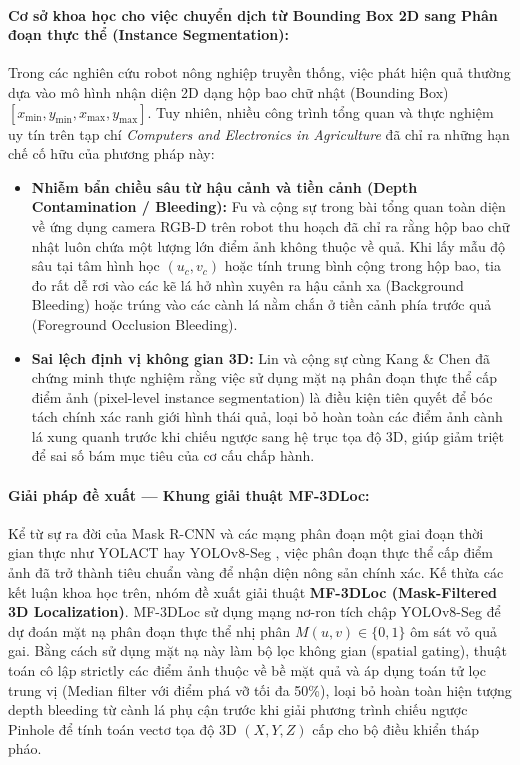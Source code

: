\documentclass[12pt,a4paper]{article}
\begin{document}
\paragraph{Cơ sở khoa học cho việc chuyển dịch từ Bounding Box 2D sang Phân đoạn thực thể (Instance Segmentation):}
Trong các nghiên cứu robot nông nghiệp truyền thống, việc phát hiện quả thường dựa vào mô hình nhận diện 2D dạng hộp bao chữ nhật (Bounding Box) $[x_{\min}, y_{\min}, x_{\max}, y_{\max}]$. Tuy nhiên, nhiều công trình tổng quan và thực nghiệm uy tín trên tạp chí \textit{Computers and Electronics in Agriculture} đã chỉ ra những hạn chế cố hữu của phương pháp này:
\begin{itemize}
    \item \textbf{Nhiễm bẩn chiều sâu từ hậu cảnh và tiền cảnh (Depth Contamination / Bleeding):} Fu và cộng sự \cite{fu2020rgbd} trong bài tổng quan toàn diện về ứng dụng camera RGB-D trên robot thu hoạch đã chỉ ra rằng hộp bao chữ nhật luôn chứa một lượng lớn điểm ảnh không thuộc về quả. Khi lấy mẫu độ sâu tại tâm hình học $(u_c, v_c)$ hoặc tính trung bình cộng trong hộp bao, tia đo rất dễ rơi vào các kẽ lá hở nhìn xuyên ra hậu cảnh xa (Background Bleeding) hoặc trúng vào các cành lá nằm chắn ở tiền cảnh phía trước quả (Foreground Occlusion Bleeding).
    \item \textbf{Sai lệch định vị không gian 3D:} Lin và cộng sự \cite{lin2021fruit} cùng Kang \& Chen \cite{kang2020dasnet} đã chứng minh thực nghiệm rằng việc sử dụng mặt nạ phân đoạn thực thể cấp điểm ảnh (pixel-level instance segmentation) là điều kiện tiên quyết để bóc tách chính xác ranh giới hình thái quả, loại bỏ hoàn toàn các điểm ảnh cành lá xung quanh trước khi chiếu ngược sang hệ trục tọa độ 3D, giúp giảm triệt để sai số bám mục tiêu của cơ cấu chấp hành.
\end{itemize}

\paragraph{Giải pháp đề xuất --- Khung giải thuật MF-3DLoc:}
Kể từ sự ra đời của Mask R-CNN \cite{he2017maskrcnn} và các mạng phân đoạn một giai đoạn thời gian thực như YOLACT \cite{bolya2019yolact} hay YOLOv8-Seg \cite{ultralytics2023}, việc phân đoạn thực thể cấp điểm ảnh đã trở thành tiêu chuẩn vàng để nhận diện nông sản chính xác. Kế thừa các kết luận khoa học trên, nhóm đề xuất giải thuật \textbf{MF-3DLoc (Mask-Filtered 3D Localization)}. MF-3DLoc sử dụng mạng nơ-ron tích chập YOLOv8-Seg \cite{ultralytics2023} để dự đoán mặt nạ phân đoạn thực thể nhị phân $M(u, v) \in \{0, 1\}$ ôm sát vỏ quả gai. Bằng cách sử dụng mặt nạ này làm bộ lọc không gian (spatial gating), thuật toán cô lập strictly các điểm ảnh thuộc về bề mặt quả và áp dụng toán tử lọc trung vị (Median filter với điểm phá vỡ tối đa 50\%), loại bỏ hoàn toàn hiện tượng depth bleeding từ cành lá phụ cận trước khi giải phương trình chiếu ngược Pinhole để tính toán vectơ tọa độ 3D $(X, Y, Z)$ cấp cho bộ điều khiển tháp pháo.
\end{document}
